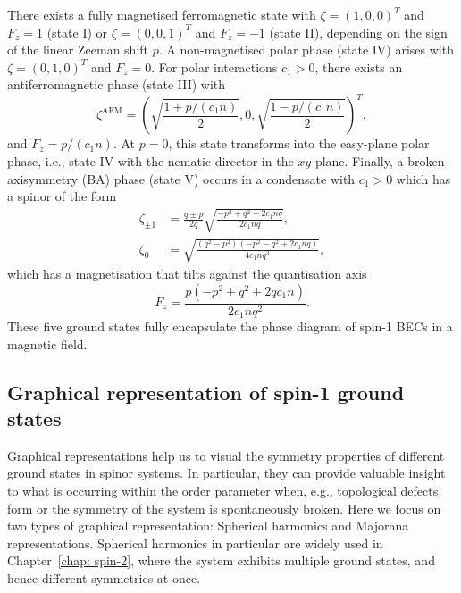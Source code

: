 There exists a fully magnetised ferromagnetic state with \(\zeta={(1, 0, 0)}^T\)
and \(F_z=1\) (state I) or \(\zeta={(0, 0, 1)}^T\) and \(F_z=-1\) (state II),
depending on the sign of the linear Zeeman shift \(p\).
A non-magnetised polar phase (state IV) arises with \(\zeta={(0, 1, 0)}^T\) and
\(F_z = 0\).
For polar interactions \(c_1 > 0\), there exists an antiferromagnetic phase
(state III) with
\begin{equation}\label{eq: AFM-spinor}
    \zeta^\mathrm{AFM} = {\left(\sqrt{\frac{1 + p/(c_1n)}{2}}, 0,
    \sqrt{\frac{1 - p/(c_1n)}{2}}\right)}^T,
\end{equation}
and \(F_z = p/(c_1n)\).
At \(p=0\), this state transforms into the easy-plane polar phase, i.e., state
IV with the nematic director in the \(xy\)-plane.
Finally, a broken-axisymmetry (BA) phase (state V) occurs in a condensate with
\(c_1 > 0\) which has a spinor of the form
\begin{equation}
    \begin{aligned}
        \zeta_{\pm 1} & =
        \frac{q \pm p}{2q}\sqrt{\frac{-p^2+q^2+2c_1nq}{2c_1nq}},              \\
        \zeta_0       & = \sqrt{\frac{(q^2-p^2)(-p^2-q^2+2c_1nq)}{4c_1nq^3}},
    \end{aligned}
    \label{eq: BA-spinor}
\end{equation}
which has a magnetisation that tilts against the quantisation axis
\begin{equation}
    F_z = \frac{p(-p^2 + q^2 + 2qc_1n)}{2c_1nq^2}.
\end{equation}
These five ground states fully encapsulate the phase diagram of spin-1 BECs
in a magnetic field.

\subsection{Graphical representation of spin-1 ground states}
Graphical representations help us to visual the symmetry properties of different
ground states in spinor systems.
In particular, they can provide valuable insight to what is occurring within
the order parameter when, e.g., topological defects form or the symmetry of the
system is spontaneously broken.
Here we focus on two types of graphical representation: Spherical harmonics and
Majorana representations.
Spherical harmonics in particular are widely used in Chapter~\ref{chap: spin-2},
where the system exhibits multiple ground states, and hence different symmetries
at once.

